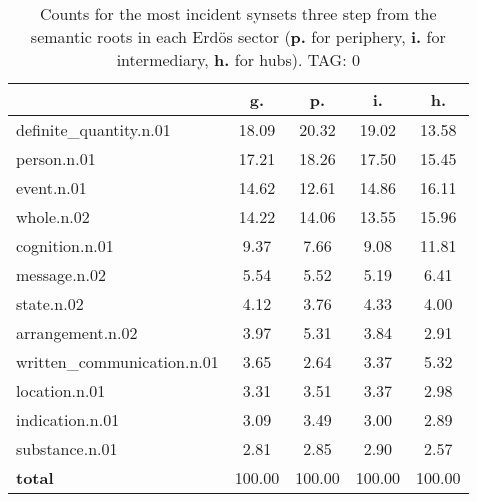 \begin{table}[h!]
\begin{center}
\begin{tabular}{| l || c | c | c | c |}\hline
 & {\bf g.} & {\bf p.} & {\bf i.} & {\bf h.} \\\hline\hline
definite\_quantity.n.01 & 18.09  & 20.32  & 19.02  & 13.58 \\\hline
person.n.01 & 17.21  & 18.26  & 17.50  & 15.45 \\\hline
event.n.01 & 14.62  & 12.61  & 14.86  & 16.11 \\\hline
whole.n.02 & 14.22  & 14.06  & 13.55  & 15.96 \\\hline
cognition.n.01 & 9.37  & 7.66  & 9.08  & 11.81 \\\hline
message.n.02 & 5.54  & 5.52  & 5.19  & 6.41 \\\hline
state.n.02 & 4.12  & 3.76  & 4.33  & 4.00 \\\hline
arrangement.n.02 & 3.97  & 5.31  & 3.84  & 2.91 \\\hline
written\_communication.n.01 & 3.65  & 2.64  & 3.37  & 5.32 \\\hline
location.n.01 & 3.31  & 3.51  & 3.37  & 2.98 \\\hline
indication.n.01 & 3.09  & 3.49  & 3.00  & 2.89 \\\hline
substance.n.01 & 2.81  & 2.85  & 2.90  & 2.57 \\\hline\hline
{{\bf total}} & 100.00  & 100.00  & 100.00  & 100.00 \\\hline
\end{tabular}
\caption{Counts for the most incident synsets three step from the semantic roots in each Erd\"os sector ({\bf p.} for periphery, {\bf i.} for intermediary, {\bf h.} for hubs). TAG: 0}
\end{center}
\end{table}